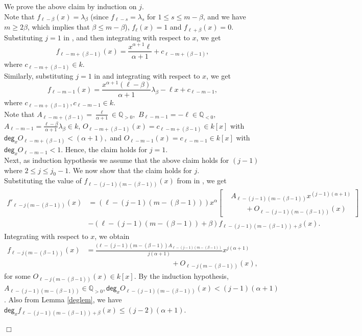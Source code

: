 \documentclass[12pt,reqno]{amsart}
\renewcommand{\deg}{\mathsf{deg}}
\renewcommand{\leq}{\leqslant}
\renewcommand{\geq}{\geqslant}
\numberwithin{thm}{section}
\theoremstyle{definition}
\numberwithin{equation}{thm}
\renewenvironment{proof}{\par\noindent {\em Proof:}}{\hfill$\Box$\medskip}
\theoremstyle{plain}
\begin{document}
\begin{proof}
\medskip
\noindent
We prove the above claim by induction on $j$.\\
Note that $f_{\ell-\beta}(x)=\lambda_\beta$ (since $ f_{\ell-s}=\lambda_s$ for $1\leq s \leq m-\beta$, and we have $m\geq 2 \beta$, which implies that $\beta\leq m-\beta$), $f_{\ell}(x)=1$ and $f_{\ell+\beta}(x)=0$.
Substituting $j=1$ in , and then integrating with respect to $x$, we get
\[
f_{\ell-m+(\beta-1)}(x)=\frac{x^{\alpha+1}\ell}{\alpha+1}+c_{\ell-m+(\beta-1)},
\]
where $c_{\ell-m+(\beta-1)}\in k$.\\
Similarly, substituting $j=1$ in  and integrating with respect to $x$, we get
\[
f_{\ell-m-1}(x)=\frac{x^{\alpha+1}(\ell-\beta)}{\alpha+1}\lambda_\beta-\ell x+c_{\ell-m-1},
\]
where $c_{\ell-m+(\beta-1)},c_{\ell-m-1}\in k$.\\ \noindent
Note that $A_{\ell-m+(\beta-1)}=\frac{\ell}{\alpha+1}\in \mathbb{Q}_{>0},$ $B_{\ell-m-1}=-\ell\in\mathbb{Q}_{<0},$ $A_{\ell-m-1}=\frac{\ell-\beta}{\alpha+1}\lambda_\beta \in k$, $O_{\ell-m+(\beta-1)}(x)=c_{\ell-m+(\beta-1)}\in k[x]$ with $\deg_x O_{\ell-m+(\beta-1)}<(\alpha+1),$ and $O_{\ell-m-1}(x)=c_{\ell-m-1}\in k[x]$ with $\deg_x O_{\ell-m-1}<1$.
Hence, the claim holds for $j=1$.
\\ \noindent Next, as induction hypothesis we assume that the above claim holds for $(j-1)$ where $2\le j\le j_0-1$. We now show that the claim holds for $j$.
\\ \noindent Substituting the value of $f_{\ell-(j-1)(m-(\beta-1))}(x)$ from  in , we get 
\begin{align*}
f'_{\ell-j(m-(\beta-1))}(x)
&=(\ell-(j-1)(m-(\beta-1)))x^\alpha
\left[
\begin{aligned}
&A_{\ell-(j-1)(m-(\beta-1))}
x^{(j-1)(\alpha+1)}\\
&\qquad+O_{\ell-(j-1)(m-(\beta-1))}(x)
\end{aligned}
\right]\\
&-(\ell-(j-1)(m-(\beta-1))+\beta)
f_{\ell-(j-1)(m-(\beta-1))+\beta}(x).
\end{align*}
Integrating with respect to $x$, we obtain
\begin{align*} 
f_{\ell-j(m-(\beta-1))}(x)
&=\frac{(\ell-(j-1)(m-(\beta-1))A_{\ell-(j-1)(m-(\beta-1))}}{j(\alpha+1)}x^{j(\alpha+1)}\\
& \hspace{5cm}+O_{\ell-j(m-(\beta-1))}(x),
\end{align*}
for some $O_{\ell-j(m-(\beta-1))}(x)\in k[x]$. By the induction hypothesis, $ A_{\ell-(j-1)(m-(\beta-1))}\in\mathbb{Q}_{>0},\deg_x O_{\ell-(j-1)(m-(\beta-1))}(x)<(j-1)(\alpha+1)$. Also from Lemma \ref{deglem}, we have $\deg_x f_{\ell-(j-1)(m-(\beta-1))+\beta}(x)\le (j-2)(\alpha+1)$.\\ \noindent

\end{proof}
\end{document}
